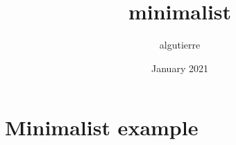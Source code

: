 \documentclass{article}
\title{minimalist}
\author{algutierre }
\date{January 2021}
\begin{document}
\maketitle

\section{Minimalist example}




\end{document}
